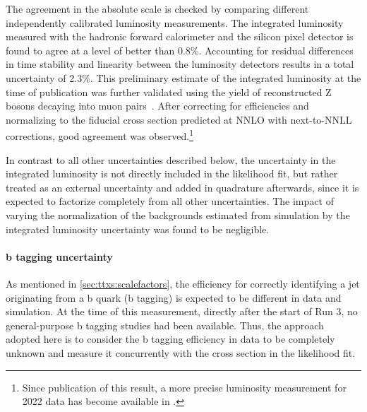 The agreement in the absolute scale is checked by comparing different independently calibrated luminosity measurements. The integrated luminosity measured with the hadronic forward calorimeter and the silicon pixel detector is found to agree at a level of better than 0.8\%.
Accounting for residual differences in time stability and linearity between the luminosity detectors results in a total uncertainty of 2.3\%. This preliminary estimate of the integrated luminosity at the time of publication was further validated using the yield of reconstructed Z bosons decaying into muon pairs~\cite{CMS:DP-2023-003}. After correcting for efficiencies and normalizing to the fiducial cross section predicted at NNLO with next-to-NNLL corrections, good agreement was observed.\footnote{Since publication of this result, a more precise luminosity measurement for 2022 data has become available in .}

In contrast to all other uncertainties described below, the uncertainty in the integrated luminosity is not directly included in the likelihood fit, but rather treated as an external uncertainty and added in quadrature afterwards, since it is expected to factorize completely from all other uncertainties.
The impact of varying the normalization of the backgrounds estimated from simulation by the integrated luminosity uncertainty was found to be negligible.

\paragraph{b tagging uncertainty}

As mentioned in \cref{sec:ttxs:scalefactors}, the efficiency for correctly identifying a jet originating from a b quark (b tagging) is expected to be different in data and simulation. At the time of this measurement, directly after the start of Run 3, no general-purpose b tagging studies had been available. Thus, the approach adopted here is to consider the b tagging efficiency in data to be completely unknown and measure it concurrently with the cross section in the likelihood fit.

